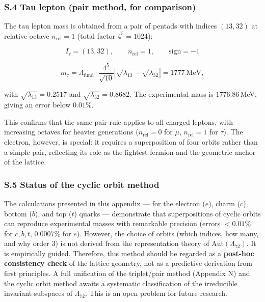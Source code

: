 \documentclass[11pt]{article}
\begin{document}
\hypertarget{s.4-tau-lepton-pair-method-for-comparison}{%
\subsubsection{S.4 Tau lepton (pair method, for
comparison)}\label{s.4-tau-lepton-pair-method-for-comparison}}

The tau lepton mass is obtained from a pair of pentads with indices
\((13,32)\) at relative octave \(n_{\text{rel}}=1\) (total factor
\(4^{5}=1024\)):

\[
I_\tau = (13,32), \qquad n_{\text{rel}} = 1, \qquad \text{sign} = -1
\]

\[
m_\tau = \Lambda_{\text{fund}} \cdot \frac{4^{5}}{\sqrt{10}} \left| \sqrt{\lambda_{13}} - \sqrt{\lambda_{32}} \right| = 1777\ \text{MeV},
\]

with \(\sqrt{\lambda_{13}} = 0.2517\) and
\(\sqrt{\lambda_{32}} = 0.8682\). The experimental mass is
\(1776.86\)\,MeV, giving an error below \(0.01\%\).

This confirms that the same pair rule applies to all charged leptons,
with increasing octaves for heavier generations (\(n_{\text{rel}}=0\)
for \(\mu\), \(n_{\text{rel}}=1\) for \(\tau\)). The electron, however,
is special: it requires a superposition of four orbits rather than a
simple pair, reflecting its role as the lightest fermion and the
geometric anchor of the lattice.

\hypertarget{s.5-status-of-the-cyclic-orbit-method}{%
\subsubsection{S.5 Status of the cyclic orbit
method}\label{s.5-status-of-the-cyclic-orbit-method}}

The calculations presented in this appendix --- for the electron
(\(e\)), charm (\(c\)), bottom (\(b\)), and top (\(t\)) quarks ---
demonstrate that superpositions of cyclic orbits can reproduce
experimental masses with remarkable precision (errors \(<0.01\%\) for
\(c,b,t\), \(0.0007\%\) for \(e\)). However, the choice of orbits (which
indices, how many, and why order 3) is not derived from the
representation theory of \(\mathrm{Aut}(\Lambda_{72})\). It is
empirically guided. Therefore, this method should be regarded as a
\textbf{post-hoc consistency check} of the lattice geometry, not as a
predictive derivation from first principles. A full unification of the
triplet/pair method (Appendix N) and the cyclic orbit method awaits a
systematic classification of the irreducible invariant subspaces of
\(\Lambda_{72}\). This is an open problem for future research.
\end{document}
